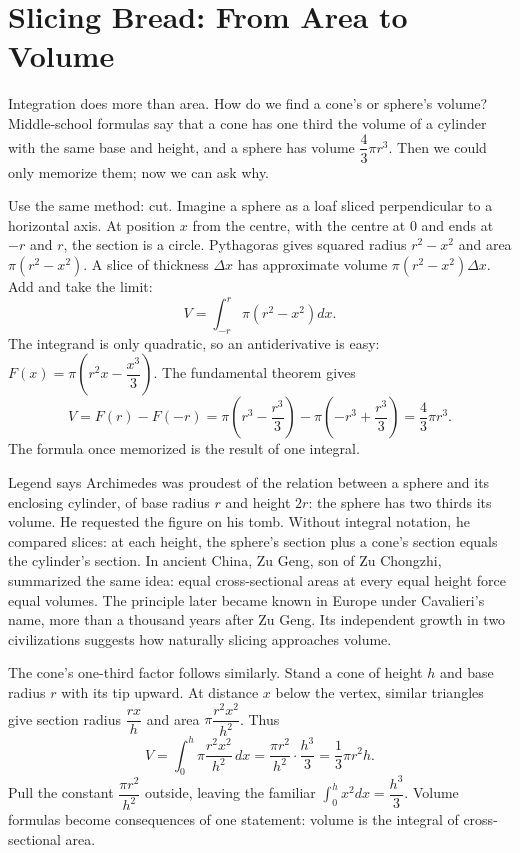 \section{Slicing Bread: From Area to Volume}

Integration does more than area. How do we find a cone's or sphere's volume? Middle-school formulas say that a cone has one third the volume of a cylinder with the same base and height, and a sphere has volume $\dfrac{4}{3}\pi r^{3}$. Then we could only memorize them; now we can ask why.

Use the same method: cut. Imagine a sphere as a loaf sliced perpendicular to a horizontal axis. At position $x$ from the centre, with the centre at $0$ and ends at $-r$ and $r$, the section is a circle. Pythagoras gives squared radius $r^{2}-x^{2}$ and area $\pi\left(r^{2}-x^{2}\right)$. A slice of thickness $\Delta x$ has approximate volume $\pi\left(r^{2}-x^{2}\right)\Delta x$. Add and take the limit:
\[
V=\int_{-r}^{r}\pi\left(r^{2}-x^{2}\right)dx .
\]
The integrand is only quadratic, so an antiderivative is easy: $F(x)=\pi\left(r^{2}x-\dfrac{x^{3}}{3}\right)$. The fundamental theorem gives
\[
V=F(r)-F(-r)=\pi\left(r^{3}-\frac{r^{3}}{3}\right)-\pi\left(-r^{3}+\frac{r^{3}}{3}\right)=\frac{4}{3}\pi r^{3} .
\]
The formula once memorized is the result of one integral.

Legend says Archimedes was proudest of the relation between a sphere and its enclosing cylinder, of base radius $r$ and height $2r$: the sphere has two thirds its volume. He requested the figure on his tomb. Without integral notation, he compared slices: at each height, the sphere's section plus a cone's section equals the cylinder's section. In ancient China, Zu Geng, son of Zu Chongzhi, summarized the same idea: equal cross-sectional areas at every equal height force equal volumes. The principle later became known in Europe under Cavalieri's name, more than a thousand years after Zu Geng. Its independent growth in two civilizations suggests how naturally slicing approaches volume.

The cone's one-third factor follows similarly. Stand a cone of height $h$ and base radius $r$ with its tip upward. At distance $x$ below the vertex, similar triangles give section radius $\dfrac{rx}{h}$ and area $\pi\dfrac{r^{2}x^{2}}{h^{2}}$. Thus
\[
V=\int_0^{h}\pi\frac{r^{2}x^{2}}{h^{2}}\,dx=\frac{\pi r^{2}}{h^{2}}\cdot\frac{h^{3}}{3}=\frac13\pi r^{2}h .
\]
Pull the constant $\dfrac{\pi r^{2}}{h^{2}}$ outside, leaving the familiar $\int_0^{h}x^{2}dx=\dfrac{h^{3}}{3}$. Volume formulas become consequences of one statement: volume is the integral of cross-sectional area.

